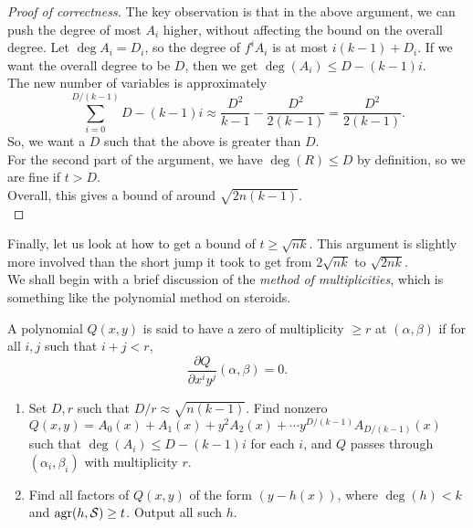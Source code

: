 			\begin{proof}[Proof of correctness]
				The key observation is that in the above argument, we can push the degree of most $A_i$ higher, without affecting the bound on the overall degree. Let $\deg A_i = D_i$, so the degree of $f^i A_i$ is at most $i(k-1) + D_i$. If we want the overall degree to be $D$, then we get $\deg(A_i) \le D - (k-1)i$.\\
				The new number of variables is approximately
				\[ \sum_{i=0}^{D/(k-1)} D - (k-1)i \approx \frac{D^2}{k-1} - \frac{D^2}{2(k-1)} = \frac{D^2}{2(k-1)}. \]
				So, we want a $D$ such that the above is greater than $D$.\\
				For the second part of the argument, we have $\deg(R) \le D$ by definition, so we are fine if $t > D$.\\
				Overall, this gives a bound of around $\sqrt{2n(k-1)}$.\\
			\end{proof}

			Finally, let us look at how to get a bound of $t \ge \sqrt{nk}$. This argument is slightly more involved than the short jump it took to get from $2\sqrt{nk}$ to $\sqrt{2nk}$.\\
			We shall begin with a brief discussion of the \emph{method of multiplicities}, which is something like the polynomial method on steroids.

			\begin{fdef}
				A polynomial $Q(x,y)$ is said to have a zero of multiplicity $\ge r$ at $(\alpha,\beta)$ if for all $i,j$ such that $i+j<r$,
				\[ \frac{\partial Q}{\partial x^i y^j} (\alpha,\beta) = 0. \]
			\end{fdef}

			\begin{enumerate}
				\item Set $D,r$ such that $D/r \approx \sqrt{n(k-1)}$. Find nonzero $Q(x,y) = A_0(x) + A_1(x) + y^2 A_2(x) + \cdots y^{D/(k-1)} A_{D/(k-1)}(x)$ such that $\deg(A_i) \le D - (k-1)i$ for each $i$, and $Q$ passes through $(\alpha_i,\beta_i)$ with multiplicity $r$.
				\item Find all factors of $Q(x,y)$ of the form $(y - h(x))$, where $\deg(h) < k$ and $\operatorname{agr}(h,\mathcal{S}) \ge t$. Output all such $h$.
			\end{enumerate}
			
